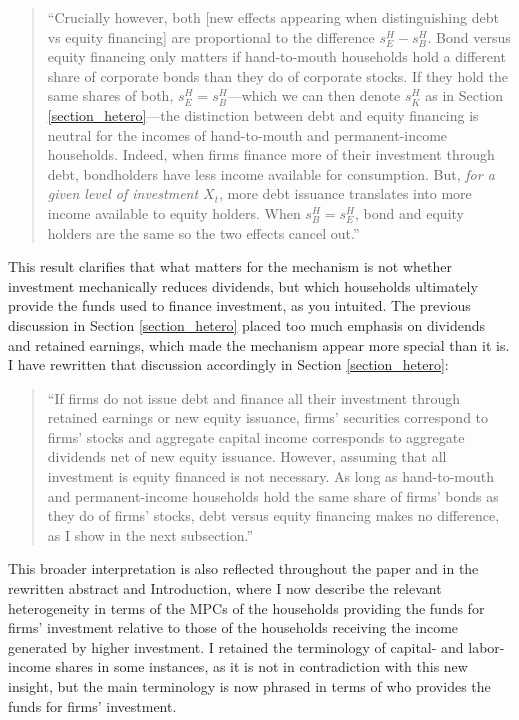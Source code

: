 \documentclass[11pt]{article}
\begin{document}
\begin{enumerate}
\begin{quote}
``Crucially however, both [new effects appearing when distinguishing debt vs equity financing] are proportional to the difference $s_E^H-s_B^H$. Bond versus equity financing only matters if hand-to-mouth households hold a different share of corporate bonds than they do of corporate stocks. If they hold the same shares of both, $s_E^H=s_B^H$---which we can then denote $s_K^H$ as in Section \ref{section_hetero}---the distinction between debt and equity financing is neutral for the incomes of hand-to-mouth and permanent-income households. Indeed, when firms finance more of their investment through debt, bondholders have less income available for consumption. But, \emph{for a given level of investment $X_t$}, more debt issuance translates into more income available to equity holders. When $s_B^H=s_E^H$, bond and equity holders are the same so the two effects cancel out.''
\end{quote}

This result clarifies that what matters for the mechanism is not whether investment mechanically reduces dividends, but which households ultimately provide the funds used to finance investment, as you intuited. The previous discussion in Section \ref{section_hetero} placed too much emphasis on dividends and retained earnings, which made the mechanism appear more special than it is. I have rewritten that discussion accordingly in Section \ref{section_hetero}:

\begin{quote}
``If firms do not issue debt and finance all their investment through retained earnings or new equity issuance, firms' securities correspond to firms' stocks and aggregate capital income corresponds to aggregate dividends net of new equity issuance. However, assuming that all investment is equity financed is not necessary. As long as hand-to-mouth and permanent-income households hold the same share of firms' bonds as they do of firms' stocks, debt versus equity financing makes no difference, as I show in the next subsection.''
\end{quote}

This broader interpretation is also reflected throughout the paper and in the rewritten abstract and Introduction, where I now describe the relevant heterogeneity in terms of the MPCs of the households providing the funds for firms' investment relative to those of the households receiving the income generated by higher investment. I retained the terminology of capital- and labor-income shares in some instances, as it is not in contradiction with this new insight, but the main terminology is now phrased in terms of who provides the funds for firms' investment.


\end{enumerate}
\end{document}
